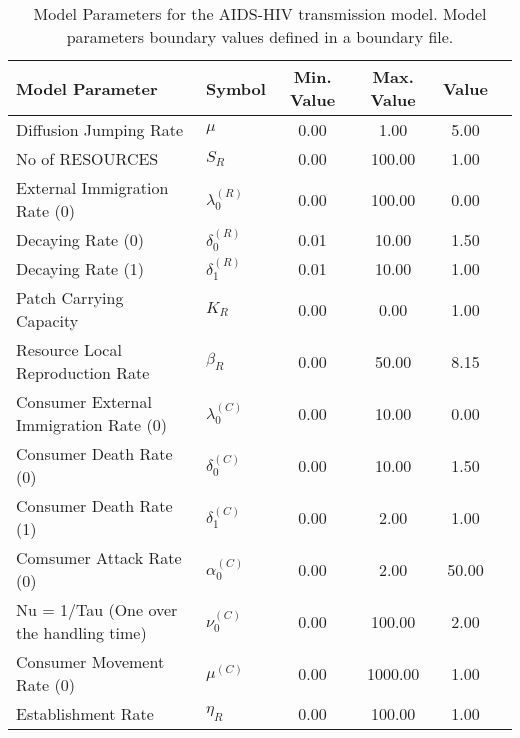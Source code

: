\begin{table}
\centering
\begin{tabular}{p{5cm}lcccc}
{\bf Model Parameter} & {\bf Symbol} & {\bf Min. Value} & {\bf Max. Value} & {\bf Value}\\
\hline\hline
Diffusion Jumping Rate & $\mu$ & 0.00 & 1.00 & 5.00\\
No of RESOURCES & $S_R$ & 0.00 & 100.00 & 1.00\\
External Immigration Rate (0) & $\lambda^{(R)}_0$ & 0.00 & 100.00 & 0.00\\
Decaying Rate (0) & $\delta^{(R)}_0$ & 0.01 & 10.00 & 1.50\\
Decaying Rate (1) & $\delta^{(R)}_1$ & 0.01 & 10.00 & 1.00\\
Patch Carrying Capacity & $K_R$ & 0.00 & 0.00 & 1.00\\
Resource Local Reproduction Rate & $\beta_R$ & 0.00 & 50.00 & 8.15\\
Consumer External Immigration Rate (0) & $\lambda^{(C)}_0$ & 0.00 & 10.00 & 0.00\\
Consumer Death Rate (0) & $\delta^{(C)}_0$ & 0.00 & 10.00 & 1.50\\
Consumer Death Rate (1) & $\delta^{(C)}_1$ & 0.00 & 2.00 & 1.00\\
Comsumer Attack Rate (0) & $\alpha^{(C)}_0$ & 0.00 & 2.00 & 50.00\\
Nu = 1/Tau (One over the handling time) & $\nu^{(C)}_0$ & 0.00 & 100.00 & 2.00\\
Consumer Movement Rate (0) & $\mu^{(C)}$ & 0.00 & 1000.00 & 1.00\\
Establishment Rate & $\eta_R$ & 0.00 & 100.00 & 1.00\\
\hline\hline
\end{tabular}
\caption{Model Parameters for the AIDS-HIV transmission model. Model parameters boundary values defined in a boundary file.}
\end{table}

